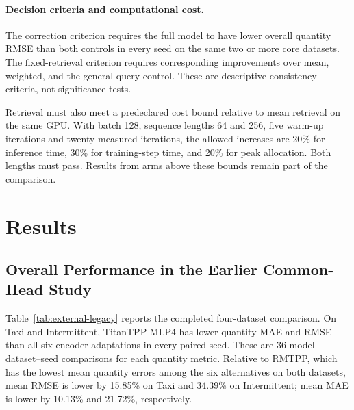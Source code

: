 \documentclass[runningheads]{llncs}
\begin{document}
\paragraph{Decision criteria and computational cost.}
The correction criterion requires the full model to have lower overall quantity RMSE than both controls in every seed on the same two or more core datasets. The fixed-retrieval criterion requires corresponding improvements over mean, weighted, and the general-query control. These are descriptive consistency criteria, not significance tests.

Retrieval must also meet a predeclared cost bound relative to mean retrieval on the same GPU. With batch 128, sequence lengths 64 and 256, five warm-up iterations and twenty measured iterations, the allowed increases are 20\% for inference time, 30\% for training-step time, and 20\% for peak allocation. Both lengths must pass. Results from arms above these bounds remain part of the comparison.

\section{Results}
\subsection{Overall Performance in the Earlier Common-Head Study}
Table~\ref{tab:external-legacy} reports the completed four-dataset comparison. On Taxi and Intermittent, TitanTPP-MLP4 has lower quantity MAE and RMSE than all six encoder adaptations in every paired seed. These are 36 model--dataset--seed comparisons for each quantity metric. Relative to RMTPP, which has the lowest mean quantity errors among the six alternatives on both datasets, mean RMSE is lower by 15.85\% on Taxi and 34.39\% on Intermittent; mean MAE is lower by 10.13\% and 21.72\%, respectively.
\end{document}
